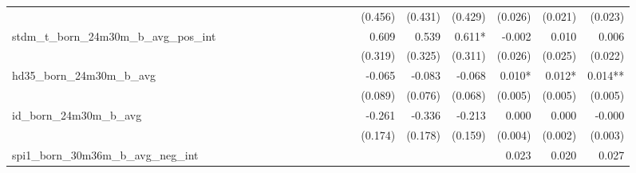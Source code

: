 \begin{tabular}{lrrrrrrrrrrrrrrrrrr}
                                            &              &              &              &              &              &              &              &              &               &              &              &               &      (0.456) &      (0.431) &       (0.429) &      (0.026) &      (0.021) &       (0.023) \\ 
stdm\_t\_born\_24m30m\_b\_avg\_pos\_int     &              &              &              &              &              &              &              &              &               &              &              &               &        0.609 &        0.539 &        0.611* &       -0.002 &        0.010 &         0.006 \\ 
                                            &              &              &              &              &              &              &              &              &               &              &              &               &      (0.319) &      (0.325) &       (0.311) &      (0.026) &      (0.025) &       (0.022) \\ 
hd35\_born\_24m30m\_b\_avg                  &              &              &              &              &              &              &              &              &               &              &              &               &       -0.065 &       -0.083 &        -0.068 &       0.010* &       0.012* &       0.014** \\ 
                                            &              &              &              &              &              &              &              &              &               &              &              &               &      (0.089) &      (0.076) &       (0.068) &      (0.005) &      (0.005) &       (0.005) \\ 
id\_born\_24m30m\_b\_avg                    &              &              &              &              &              &              &              &              &               &              &              &               &       -0.261 &       -0.336 &        -0.213 &        0.000 &        0.000 &        -0.000 \\ 
                                            &              &              &              &              &              &              &              &              &               &              &              &               &      (0.174) &      (0.178) &       (0.159) &      (0.004) &      (0.002) &       (0.003) \\ 
spi1\_born\_30m36m\_b\_avg\_neg\_int        &              &              &              &              &              &              &              &              &               &              &              &               &              &              &               &        0.023 &        0.020 &         0.027 \\ 

\end{tabular}
